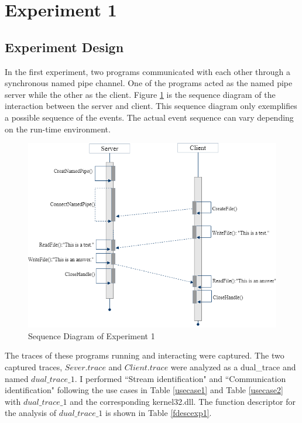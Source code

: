 \section{Experiment 1}
\subsection{Experiment Design}
In the first experiment, two programs communicated with each other through a synchronous named pipe channel. One of the programs acted as the named pipe server while the other as the client. Figure \ref{exp1} is the sequence diagram of the interaction between the server and client. This sequence diagram only exemplifies a possible sequence of the events. The actual event sequence can vary depending on the run-time environment. 


\begin{figure}[H]
\centerline{\includegraphics[scale=0.6]{Figures/exp1}}
 \caption{Sequence Diagram of Experiment 1}
\label{exp1}
\end{figure}

The traces of these programs running and interacting were captured. The two captured traces, $Sever.trace$ and $Client.trace$ were analyzed as a dual\_trace and named $dual\_trace\_1$. I performed ``Stream identification" and ``Communication identification" following the use cases in Table \ref{usecase1} and Table \ref{usecase2} with $dual\_trace\_1$ and the corresponding kernel32.dll. The function descriptor for the analysis of $dual\_trace\_1$ is shown in Table \ref{fdescexp1}.

